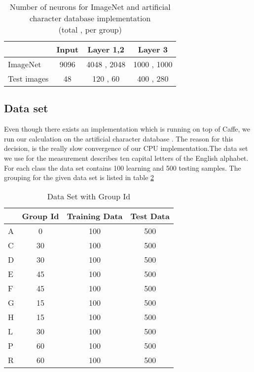 \begin{table}[htbp]
\caption{Number of neurons for ImageNet and artificial character database implementation \\ (total , per group) }

\centering
\begin{tabular}{l|c|cc}
       ~            & Input      & Layer 1,2       & Layer 3  \\
    \midrule                                     
    ImageNet        & 9096  & 4048 , 2048   & 1000 , 1000  \\
    Test images     & 48   & 120 , 60       & 400 , 280  \\
\end{tabular}
\label{table:numberOfNeurons}
\end{table}

\subsection{Data set}
Even though there exists an implementation which is running on top of Caffe, we run our calculation on the artificial character database \cite{dset-sup}. The reason for this decision, is the really slow convergence of our CPU implementation.The data set we use for the measurement describes ten capital letters of the English alphabet. For each class the data set contains 100 learning and 500 testing samples. The grouping for the given data set is listed in table \ref{table:Group_ID}

\begin{table}[htbp]
\caption{Data Set with Group Id}
\centering
\begin{tabular}{l|cc|c}
       ~            & Group Id & Training Data & Test Data  \\
    \midrule                                     
    A     & 0 & 100  & 500  \\
    C     & 30 & 100 & 500  \\
    D     & 30 & 100 & 500  \\
    E     & 45 & 100  & 500  \\
    F     & 45 & 100 & 500  \\
    G     & 15 & 100  & 500  \\
    H     & 15 & 100 & 500  \\
    L     & 30 & 100 & 500  \\
    P     & 60 & 100 & 500  \\
    R     & 60 & 100 & 500  \\

\end{tabular}
\label{table:Group_ID}
\end{table}

